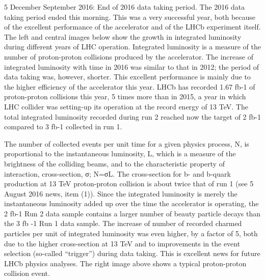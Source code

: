 5 December September 2016: End of 2016 data taking period.
The 2016 data taking period ended this morning. This was a very successful year, both because of the excellent performance of the accelerator and of the LHCb experiment itself.
The left and central images below show the growth in integrated luminosity during different years of LHC operation. Integrated luminosity is a measure of the number of proton-proton collisions produced by the accelerator. The increase of integrated luminosity with time in 2016 was similar to that in 2012; the period of data taking was, however, shorter. This excellent performance is mainly due to the higher efficiency of the accelerator this year. LHCb has recorded 1.67 fb-1 of proton-proton collisions this year, 5 times more than in 2015, a year in which LHC collider was setting-up its operation at the record energy of 13 TeV. The total integrated luminosity recorded during run 2 reached now the target of 2 fb-1 compared to 3 fb-1 collected in run 1.
   
The number of collected events per unit time for a given physics process, N, is proportional to the instantaneous luminosity, L, which is a measure of the brightness of the colliding beams, and to the characteristic property of interaction, cross-section, σ; N=σL. The cross-section for b- and b-quark production at 13 TeV proton-proton collision is about twice that of run 1 (see 5 August 2016 news, item (1)). Since the integrated luminosity is merely the instantaneous luminosity added up over the time the accelerator is operating, the 2 fb-1 Run 2 data sample contains a larger number of beauty particle decays than the 3 fb -1 Run 1 data sample. The increase of number of recorded charmed particles per unit of integrated luminosity was even higher, by a factor of 5, both due to the higher cross-section at 13 TeV and to improvements in the event selection (so-called “trigger”) during data taking. This is excellent news for future LHCb physics analyses. The right image above shows a typical proton-proton collision event.
